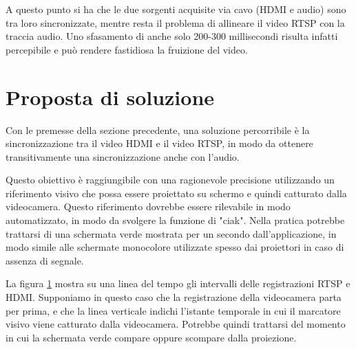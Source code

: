 A questo punto si ha che le due sorgenti acquisite via cavo (HDMI e audio) sono tra loro sincronizzate, mentre resta il problema di allineare il video RTSP con la traccia audio. Uno sfasamento di anche solo 200-300 millisecondi risulta infatti percepibile e può rendere fastidiosa la fruizione del video.

\section{Proposta di soluzione}
\label{sec:sync_soluzione}

Con le premesse della sezione precedente, una soluzione percorribile è la sincronizzazione tra il video HDMI e il video RTSP, in modo da ottenere transitivamente una sincronizzazione anche con l'audio.

Questo obiettivo è raggiungibile con una ragionevole precisione utilizzando un riferimento visivo che possa essere proiettato su schermo e quindi catturato dalla videocamera. Questo riferimento dovrebbe essere rilevabile in modo automatizzato, in modo da svolgere la funzione di "ciak". Nella pratica potrebbe trattarsi di una schermata verde mostrata per un secondo dall'applicazione, in modo simile alle schermate monocolore utilizzate spesso dai proiettori in caso di assenza di segnale.

La figura \ref{fig:sync1} mostra su una linea del tempo gli intervalli delle registrazioni RTSP e HDMI. Supponiamo in questo caso che la registrazione della videocamera parta per prima, e che la linea verticale indichi l'istante temporale in cui il marcatore visivo viene catturato dalla videocamera. Potrebbe quindi trattarsi del momento in cui la schermata verde compare oppure scompare dalla proiezione.

\begin{figure}[H]
	\centering
	

	\caption{}
	\label{fig:sync1}
\end{figure}

